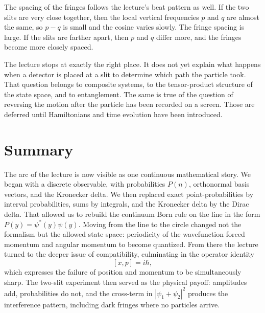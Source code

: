 The spacing of the fringes follows the lecture's beat pattern as well. If the two slits are very close together, then the local vertical frequencies \(p\) and \(q\) are almost the same, so \(p-q\) is small and the cosine varies slowly. The fringe spacing is large. If the slits are farther apart, then \(p\) and \(q\) differ more, and the fringes become more closely spaced.

The lecture stops at exactly the right place. It does not yet explain what happens when a detector is placed at a slit to determine which path the particle took. That question belongs to composite systems, to the tensor-product structure of the state space, and to entanglement. The same is true of the question of reversing the motion after the particle has been recorded on a screen. Those are deferred until Hamiltonians and time evolution have been introduced.

\section{Summary}

The arc of the lecture is now visible as one continuous mathematical story. We began with a discrete observable, with probabilities \(P(n)\), orthonormal basis vectors, and the Kronecker delta. We then replaced exact point-probabilities by interval probabilities, sums by integrals, and the Kronecker delta by the Dirac delta. That allowed us to rebuild the continuum Born rule on the line in the form \(P(y)=\psi^*(y)\psi(y)\). Moving from the line to the circle changed not the formalism but the allowed state space: periodicity of the wavefunction forced momentum and angular momentum to become quantized. From there the lecture turned to the deeper issue of compatibility, culminating in the operator identity
\[
[x,p]=i\hbar,
\]
which expresses the failure of position and momentum to be simultaneously sharp. The two-slit experiment then served as the physical payoff: amplitudes add, probabilities do not, and the cross-term in \(|\psi_1+\psi_2|^2\) produces the interference pattern, including dark fringes where no particles arrive.